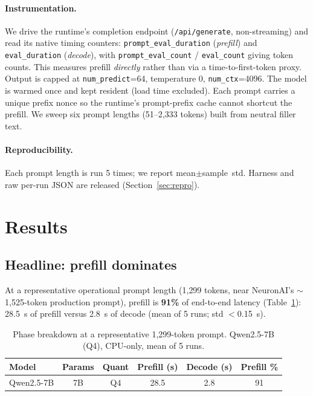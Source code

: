 \documentclass[10pt,twocolumn]{article}
\begin{document}
\paragraph{Instrumentation.}
We drive the runtime's completion endpoint (\texttt{/api/generate},
non-streaming) and read its native timing counters:
\texttt{prompt\_eval\_duration} (\emph{prefill}) and \texttt{eval\_duration}
(\emph{decode}), with \texttt{prompt\_eval\_count} / \texttt{eval\_count}
giving token counts. This measures prefill \emph{directly} rather than via
a time-to-first-token proxy. Output is capped at \texttt{num\_predict}=64,
temperature 0, \texttt{num\_ctx}=4096. The model is warmed once and kept
resident (load time excluded). Each prompt carries a unique prefix nonce so
the runtime's prompt-prefix cache cannot shortcut the prefill. We sweep six
prompt lengths (51--2{,}333 tokens) built from neutral filler text.

\paragraph{Reproducibility.}
Each prompt length is run 5 times; we report mean$\pm$sample~std. Harness
and raw per-run JSON are released (Section~\ref{sec:repro}).

\section{Results}
\label{sec:results}

\subsection{Headline: prefill dominates}
\label{sec:results-headline}
At a representative operational prompt length (1{,}299 tokens, near
NeuronAI's $\sim$1{,}525-token production prompt), prefill is
\textbf{91\%} of end-to-end latency (Table~\ref{tab:money}): 28.5~s of
prefill versus 2.8~s of decode (mean of 5 runs; std $<$0.15~s).

\begin{table}[t]
  \centering
  \caption{Phase breakdown at a representative 1{,}299-token prompt.
  Qwen2.5-7B (Q4), CPU-only, mean of 5 runs.}
  \label{tab:money}
  \begin{tabular}{lccccc}
    \toprule
    Model & Params & Quant & Prefill (s) & Decode (s) & Prefill \% \\
    \midrule
    Qwen2.5-7B & 7B & Q4 & 28.5 & 2.8 & 91 \\
    \bottomrule
  \end{tabular}
\end{table}
\end{document}
